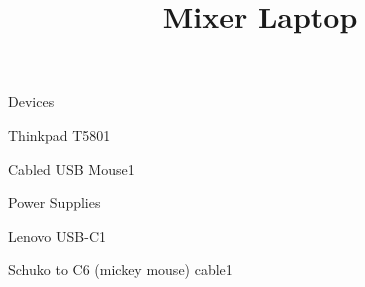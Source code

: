 \def\papersize{5}




\title{Mixer Laptop}

\begin{checklist}{Devices}
  \item{Thinkpad T580}{1}
  \item{Cabled USB Mouse}{1}
\end{checklist}

\begin{checklist}{Power Supplies}
  \item{Lenovo USB-C}{1}
  \item{Schuko to C6 (mickey mouse) cable}{1}
\end{checklist}


